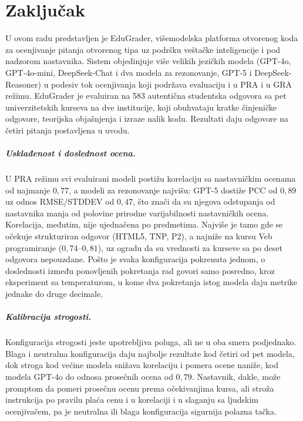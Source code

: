 \chapter{Zaključak}
\label{sec:zakljucak}

U ovom radu predstavljen je EduGrader,
višemodelska platforma otvorenog koda za ocenjivanje pitanja otvorenog tipa uz podršku veštačke inteligencije i pod nadzorom nastavnika.
Sistem objedinjuje više velikih jezičkih modela (GPT-4o, GPT-4o-mini, DeepSeek-Chat i dva modela za rezonovanje,
GPT-5 i DeepSeek-Reasoner) u podesiv tok ocenjivanja koji podržava evaluaciju i u PRA i u GRA režimu.
EduGrader je evaluiran na 583 autentična studentska odgovora sa pet univerzitetskih kurseva na dve institucije,
koji obuhvataju kratke činjeničke odgovore, teorijska objašnjenja i izraze nalik kodu.
Rezultati daju odgovore na četiri pitanja postavljena u uvodu.

\paragraph{Usklađenost i doslednost ocena.}
U PRA režimu svi evaluirani modeli postižu korelaciju sa nastavničkim ocenama od najmanje $0{,}77$,
a modeli za rezonovanje najvišu: GPT-5 dostiže PCC od $0{,}89$ uz odnos RMSE/STDDEV od $0{,}47$,
što znači da su njegova odstupanja od nastavnika manja od polovine prirodne varijabilnosti nastavničkih ocena.
Korelacija, međutim, nije ujednačena po predmetima.
Najviše je tamo gde se očekuje strukturiran odgovor (HTML5, TNP, P2),
a najniže na kursu Veb programiranje ($0{,}74$--$0{,}81$), uz ogradu da su vrednosti za kurseve sa po deset odgovora nepouzdane.
Pošto je svaka konfiguracija pokrenuta jednom, o doslednosti između ponovljenih pokretanja rad govori samo posredno,
kroz eksperiment sa temperaturom, u kome dva pokretanja istog modela daju metrike jednake do druge decimale.

\newpage
\paragraph{Kalibracija strogosti.}
Konfiguracija strogosti jeste upotrebljiva poluga, ali ne u oba smera podjednako.
Blaga i neutralna konfiguracija daju najbolje rezultate kod četiri od pet modela,
dok stroga kod većine modela snižava korelaciju i pomera ocene naniže, kod modela GPT-4o do odnosa prosečnih ocena od $0{,}79$.
Nastavnik, dakle, može promptom da pomeri prosečnu ocenu prema očekivanjima kursa,
ali stroža instrukcija po pravilu plaća cenu i u korelaciji i u slaganju sa ljudskim ocenjivačem,
pa je neutralna ili blaga konfiguracija sigurnija polazna tačka.

